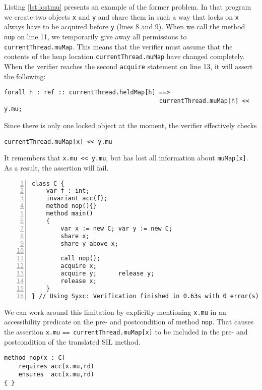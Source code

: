 Listing \ref{lst:lostmu} presents an example of the former problem. 
In that program we create two objects \lstinline!x! and \lstinline!y! and share them in such a way that locks on \lstinline!x! always have to be acquired before \lstinline!y! (lines 8 and 9).
When we call the method \lstinline!nop! on line 11, we temporarily give away all permissions to \lstinline!currentThread.muMap!.
This means that the verifier must assume that the contents of the heap location \lstinline!currentThread.muMap! have changed completely.
When the verifier reaches the second \lstinline[language=Chalice]!acquire! statement on line 13, it will assert the following:
\begin{lstlisting}[language=SIL]
forall h : ref :: currentThread.heldMap[h] ==> 
                                           currentThread.muMap[h] << y.mu;
\end{lstlisting}
Since there is only one locked object at the moment, the verifier effectively checks 
\begin{lstlisting}
currentThread.muMap[x] << y.mu
\end{lstlisting}
It remembers that \lstinline!x.mu << y.mu!, but has lost all information about \lstinline!muMap[x]!.
As a result, the assertion will fail.

\begin{lstlisting}[float,caption={Losing information about \lstinline!mu!.},label=lst:lostmu,language=chalice,numbers=left]
class C {
    var f : int;
    invariant acc(f);
    method nop(){}
    method main()
    {
        var x := new C; var y := new C;
        share x;        
        share y above x;

        call nop();
        acquire x;
        acquire y;      release y;
        release x;
    }
} // Using Syxc: Verification finished in 0.63s with 0 error(s)
\end{lstlisting}

We can work around this limitation by explicitly mentioning \lstinline!x.mu! in an accessibility predicate on the pre- and postcondition of method \lstinline!nop!.
That causes the assertion \lstinline!x.mu! \lstinline!==!~\lstinline!currentThread.muMap[x]! to be included in the pre- and postcondition of the translated SIL method.

\begin{lstlisting}[float,caption={Modified method \lstinline!nop! from listing \ref{lst:lostmu}, causes verification to succeed.},label=lst:lostmufixed,language=chalice]
method nop(x : C)
    requires acc(x.mu,rd)
    ensures  acc(x.mu,rd)
{ }
\end{lstlisting}


